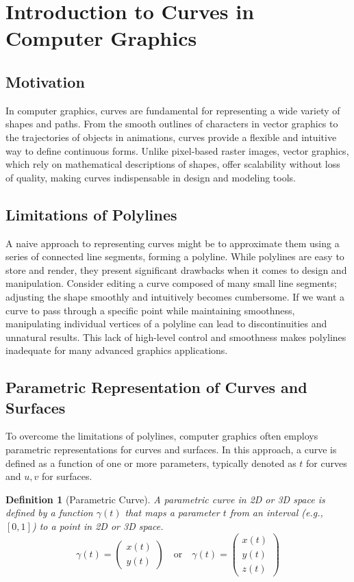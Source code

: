 \documentclass{article}
\newtheorem{definition}{Definition}
\begin{document}
\sloppy
\section{Introduction to Curves in Computer Graphics}

\subsection{Motivation}

In computer graphics, curves are fundamental for representing a wide variety of shapes and paths. From the smooth outlines of characters in vector graphics to the trajectories of objects in animations, curves provide a flexible and intuitive way to define continuous forms.  Unlike pixel-based raster images, vector graphics, which rely on mathematical descriptions of shapes, offer scalability without loss of quality, making curves indispensable in design and modeling tools.

\subsection{Limitations of Polylines}

A naive approach to representing curves might be to approximate them using a series of connected line segments, forming a polyline. While polylines are easy to store and render, they present significant drawbacks when it comes to design and manipulation.  Consider editing a curve composed of many small line segments; adjusting the shape smoothly and intuitively becomes cumbersome.  If we want a curve to pass through a specific point while maintaining smoothness, manipulating individual vertices of a polyline can lead to discontinuities and unnatural results.  This lack of high-level control and smoothness makes polylines inadequate for many advanced graphics applications.

\subsection{Parametric Representation of Curves and Surfaces}

To overcome the limitations of polylines, computer graphics often employs parametric representations for curves and surfaces.  In this approach, a curve is defined as a function of one or more parameters, typically denoted as \(t\) for curves and \(u, v\) for surfaces.

\begin{definition}[Parametric Curve]
A parametric curve in 2D or 3D space is defined by a function \(\gamma(t)\) that maps a parameter \(t\) from an interval (e.g., \([0, 1]\)) to a point in 2D or 3D space.
\[ \gamma(t) = \begin{pmatrix} x(t) \\ y(t) \end{pmatrix} \quad \text{or} \quad \gamma(t) = \begin{pmatrix} x(t) \\ y(t) \\ z(t) \end{pmatrix} \]
\end{definition}
\end{document}
